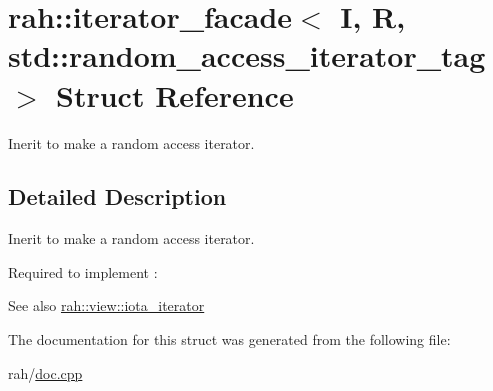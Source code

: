 \hypertarget{structrah_1_1iterator__facade_3_01_i_00_01_r_00_01std_1_1random__access__iterator__tag_01_4}{}\section{rah\+::iterator\+\_\+facade$<$ I, R, std\+::random\+\_\+access\+\_\+iterator\+\_\+tag $>$ Struct Reference}
\label{structrah_1_1iterator__facade_3_01_i_00_01_r_00_01std_1_1random__access__iterator__tag_01_4}


Inerit to make a random access iterator.  




\subsection{Detailed Description}
Inerit to make a random access iterator. 

Required to implement \+: 
\begin{DoxyCode}{0}
\end{DoxyCode}
 \begin{DoxySeeAlso}{See also}
\mbox{\hyperlink{structrah_1_1view_1_1iota__iterator}{rah\+::view\+::iota\+\_\+iterator}} 
\end{DoxySeeAlso}


The documentation for this struct was generated from the following file\+:\begin{DoxyCompactItemize}
\item 
rah/\mbox{\hyperlink{doc_8cpp}{doc.\+cpp}}\end{DoxyCompactItemize}
